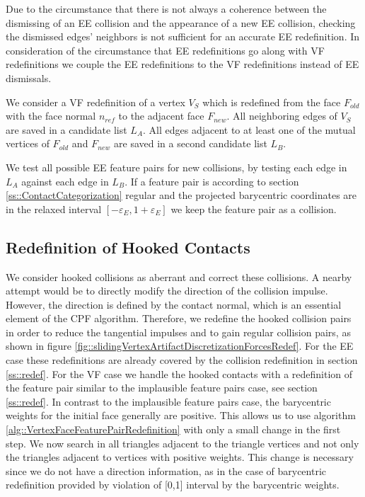 Due to the circumstance that there is not always a coherence between the dismissing of an EE collision and the appearance of a new EE collision, checking the dismissed edges' neighbors is not sufficient for an accurate EE redefinition.
In consideration of the circumstance that EE redefinitions go along with VF redefinitions we couple the EE redefinitions to the VF redefinitions instead of EE dismissals.

We consider a VF redefinition of a vertex $V_S$ which is redefined from the face $F_{old}$ with the face normal $n_{ref}$ to the adjacent face $F_{new}$. All neighboring edges of $V_S$ are saved in a candidate list $L_A$. All edges adjacent to at least one of the mutual vertices of  $F_{old}$ and $F_{new}$ are saved in a second candidate list $L_B$. 

 
We test all possible EE feature pairs for new collisions, by testing each edge in $L_A$  against each edge in $L_B$. If a feature pair is according to section \ref{ss::ContactCategorization} regular and the projected barycentric coordinates are in the relaxed interval $[-\varepsilon_E,1+\varepsilon_E]$ we keep the feature pair as a collision.


\subsection{Redefinition of Hooked Contacts}
\label{ss::sliding}

We consider hooked collisions as aberrant and correct these collisions.
A nearby attempt would be to directly modify the direction of the collision impulse.
However, the direction is defined by the contact normal, which is an essential element of the CPF algorithm. Therefore, we redefine the hooked collision pairs in order to reduce the tangential impulses and to gain regular collision pairs, as shown in figure \ref{fig::slidingVertexArtifactDiscretizationForcesRedef}.
For the EE case these redefinitions are already covered by the collision redefinition in section \ref{ss::redef}. 
For the VF case we handle the hooked contacts with a redefinition of the feature pair similar to the implausible feature pairs case, see section \ref{ss::redef}.
In contrast to the implausible feature pairs case, the barycentric weights for the initial face generally are positive.
This allows us to use algorithm \ref{alg::VertexFaceFeaturePairRedefinition} with only a small change in the first step. We now search in all triangles adjacent to the triangle vertices and not only the triangles adjacent to vertices with positive weights. This change is necessary since we do not have a direction information, as in the case of barycentric redefinition provided by violation of [0,1] interval by the barycentric weights. 

